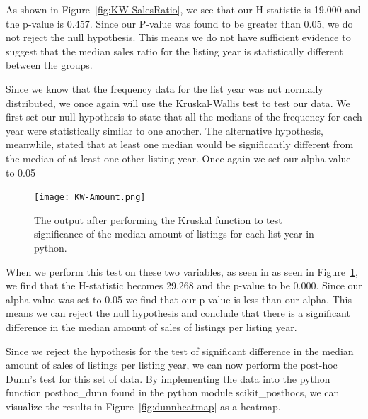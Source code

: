 \documentclass[12pt]{article}
\begin{document}
As shown in Figure~\ref{fig:KW-SalesRatio}, we see that our H-statistic is 19.000 and the p-value is 0.457. Since our P-value was found to be greater than 0.05, we do not reject the null hypothesis. This means we do not have sufficient evidence to suggest that the median sales ratio for the listing year is statistically different between the groups.

Since we know that the frequency data for the list year was not normally distributed, we once again will use the Kruskal-Wallis test to test our data. We first set our null hypothesis to state that all the medians of the frequency for each year were statistically similar to one another. The alternative hypothesis, meanwhile, stated that at least one median would be significantly different from the median of at least one other listing year. Once again we set our alpha value to 0.05

\begin{figure}[!t]
  \centering
  \texttt{[image: KW-Amount.png]}
  \caption{The output after performing the Kruskal function to test significance of the median amount of listings for each list year in python.}
  \label{fig:KW-Amount}
\end{figure}

When we perform this test on these two variables, as seen in as seen in Figure~\ref{fig:KW-Amount}, we find that the H-statistic becomes 29.268 and the p-value to be 0.000. Since our alpha value was set to 0.05 we find that our p-value is less than our alpha. This means we can reject the null hypothesis and conclude that there is a significant difference in the median amount of sales of listings per listing year. 

Since we reject the hypothesis for the test of significant difference in the median amount of sales of listings per listing year, we can now perform the post-hoc Dunn's test for this set of data. By implementing the data into the python function posthoc\_dunn found in the python module scikit\_posthocs, we can visualize the results in Figure~\ref{fig:dunnheatmap} as a heatmap.
\end{document}
